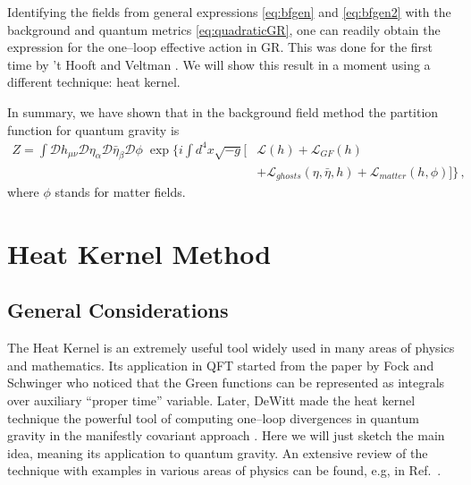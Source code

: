 \documentclass[11pt,a4paper]{article}
\newcommand{\be}{\begin{equation}}
\newcommand{\ee}{\end{equation}}
\newcommand\m{\mu}
\newcommand\D{\Delta}
\newcommand\n{\nu}
\renewcommand\a{\alpha}
\renewcommand\b{\beta}
\renewcommand{\D}{\mathcal{D}}
\begin{document}
Identifying the fields from general expressions \eqref{eq:bfgen} and \eqref{eq:bfgen2}
with the background and quantum metrics \eqref{eq:quadraticGR}, one can readily obtain
the expression for the one--loop effective action in GR. This was done for the first time by 't Hooft and Veltman \cite{'tHooft:1974bx}. We will show this result in a moment using a different technique: heat kernel.

In summary, we have shown that in the background field method the partition function
for quantum gravity is
\be
\begin{split}
Z=\int \D h_{\m\n} \D \eta_\a \D \bar \eta_\b \D\phi \; \exp\Big\{i\int d^4x \sqrt{-g}[ & \mathcal{L}(h)+\mathcal{L}_{GF}(h)\\
&+\mathcal{L}_{ghosts}(\eta, \bar \eta , h)+\mathcal{L}_{matter}(h , \phi)]\Big\} \,,
\end{split}
\ee
where $\phi$ stands for matter fields.

\section{Heat Kernel Method}
\label{sec:heat}

\subsection{General Considerations}

The Heat Kernel is an extremely useful tool widely used in many areas of physics and mathematics. Its application in QFT started from the paper by Fock \cite{Fock:2004mm} and Schwinger \cite{Schwinger:1951nm} who noticed that the Green functions can be represented as integrals over auxiliary ``proper time'' variable. Later, DeWitt made the heat kernel technique the powerful tool of computing one--loop divergences in quantum gravity in the manifestly covariant approach \cite{DeWitt:1965jb}. Here we will just sketch the main idea, meaning its application to quantum gravity. An extensive review of the technique with examples in various areas of physics can be found, e.g, in Ref.~\cite{Vassilevich:2003xt}.
\end{document}
